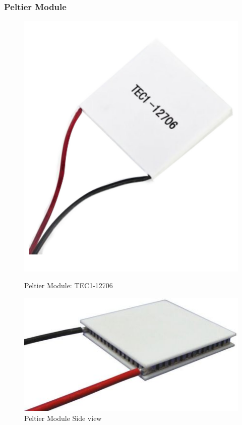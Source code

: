 \documentclass[10pt]{beamer}
\begin{document}
{
	\begin{frame}
		\frametitle{Peltier Module}
		\begin{figure}[h!]
			\begin{minipage}[b]{0.4\linewidth}
				\includegraphics[width=0.8\linewidth]{peltier_module1}
				\caption{Peltier Module: TEC1-12706}
			\end{minipage}
			\begin{minipage}[b]{0.4\linewidth}
				\includegraphics[width=0.8\linewidth]{peltier_module}
				\caption{Peltier Module Side view}
			\end{minipage}
		\end{figure}
	\end{frame}
}
\end{document}
